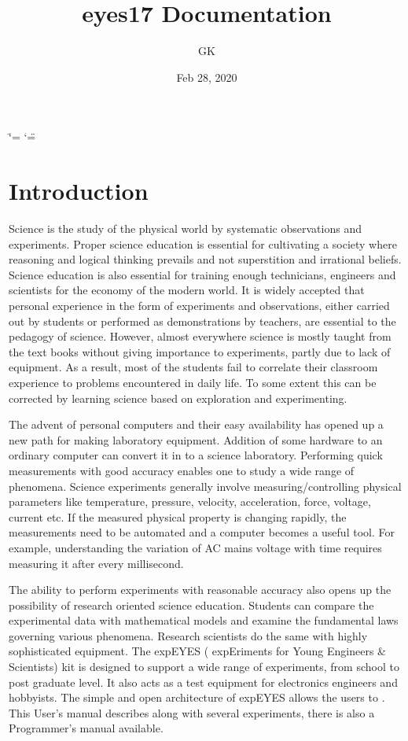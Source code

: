 \documentclass[a4paper,12pt,english]{sphinxmanual}
\title{eyes17 Documentation}
\date{Feb 28, 2020}
\author{GK}
\begin{document}
\ifdefined\shorthandoff
  \ifnum\catcode`\=\string=\active\shorthandoff{=}\fi
  \ifnum\catcode`\"=\active{}\fi
\fi

\pagestyle{empty}


\pagestyle{plain}
\sphinxtableofcontents
\pagestyle{normal}
\label{\detokenize{index::doc}}



\chapter{Introduction}
\label{\detokenize{1.1:introduction}}\label{\detokenize{1.1::doc}}
Science is the study of the physical world by systematic observations
and experiments. Proper science education is essential for cultivating a
society where reasoning and logical thinking prevails and not
superstition and irrational beliefs. Science education is also essential
for training enough technicians, engineers and scientists for the
economy of the modern world. It is widely accepted that personal
experience in the form of experiments and observations, either carried
out by students or performed as demonstrations by teachers, are
essential to the pedagogy of science. However, almost everywhere science
is mostly taught from the text books without giving importance to
experiments, partly due to lack of equipment. As a result, most of the
students fail to correlate their classroom experience to problems
encountered in daily life. To some extent this can be corrected by
learning science based on exploration and experimenting.

The advent of personal computers and their easy availability has opened
up a new path for making laboratory equipment. Addition of some hardware
to an ordinary computer can convert it in to a science laboratory.
Performing quick measurements with good accuracy enables one to study a
wide range of phenomena. Science experiments generally involve
measuring/controlling physical parameters like temperature, pressure,
velocity, acceleration, force, voltage, current etc. If the measured
physical property is changing rapidly, the measurements need to be
automated and a computer becomes a useful tool. For example,
understanding the variation of AC mains voltage with time requires
measuring it after every millisecond.

The ability to perform experiments with reasonable accuracy also opens
up the possibility of research oriented science education. Students can
compare the experimental data with mathematical models and examine the
fundamental laws governing various phenomena. Research scientists do the
same with highly sophisticated equipment. The expEYES ( expEriments for
Young Engineers \& Scientists) kit is designed to support a wide range of
experiments, from school to post graduate level. It also acts as a test
equipment for electronics engineers and hobbyists. The simple and open
architecture of expEYES allows the users to . This User’s manual describes  along with
several experiments, there is also a Programmer’s manual available.
\end{document}
